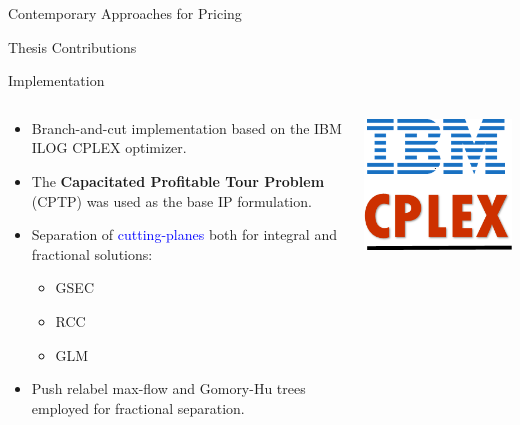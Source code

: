 \begin{frame}{Contemporary Approaches for Pricing}
\end{frame}

\begin{frame}{Thesis Contributions}
\end{frame}

\begin{frame}{Implementation}
	\begin{columns}
		\begin{column}{.85\textwidth}
			\begin{itemize}
				\item Branch-and-cut implementation based on the IBM ILOG CPLEX optimizer.
				\item The \textbf{Capacitated Profitable Tour Problem} (CPTP) \parencite{jepsen2014} was used as the base IP formulation.
				\item Separation of \textcolor{blue}{cutting-planes} both for integral and fractional solutions:
				      \begin{itemize}
					      \item GSEC
					      \item RCC
					      \item GLM
				      \end{itemize}
				\item Push relabel max-flow and Gomory-Hu trees employed for fractional separation.
			\end{itemize}
		\end{column}
		\begin{column}{0.15\textwidth}
			\centering
			\includegraphics[width=\textwidth]{./Imgs/IBM-ILOG-CPLEX-logo.png}
		\end{column}
	\end{columns}
\end{frame}

